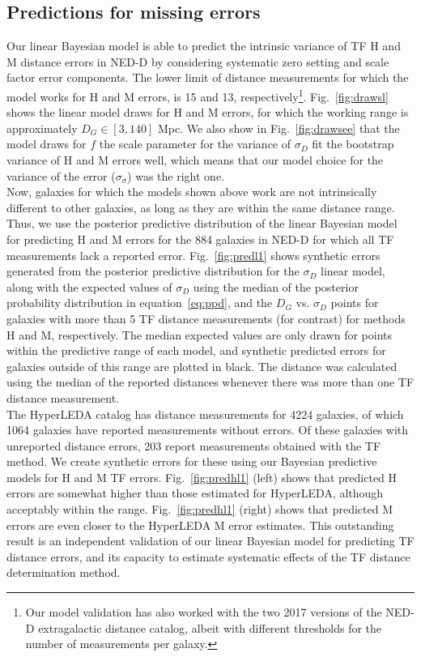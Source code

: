 \documentclass[a4paper,fleqn,usenatbib]{mnras}
\begin{document}
\subsection{Predictions for missing errors}
\label{sec:pred} 
Our linear Bayesian model is able to predict the intrinsic variance of TF H and M distance errors in NED-D by considering systematic zero setting and scale factor error components. The lower limit of distance measurements for which the model works for H and M errors, is 15 and 13, respectively\footnote{Our model validation has also worked with the two 2017 versions of the NED-D extragalactic distance catalog, albeit with different thresholds for the number of measurements per galaxy.}. Fig.~\ref{fig:drawsl} shows the linear model draws for H and M errors, for which the working range is approximately $D_G\in[3,140]$ Mpc. We also show in Fig.~\ref{fig:drawsee} that the model draws for $f$ the scale parameter for the variance of $\sigma_D$ fit the bootstrap variance of H and M errors well, which means that our model choice for the variance of the error ($\sigma_\sigma$) was the right one. \\

Now, galaxies for which the models shown above work are not intrinsically different to other galaxies, as long as they are within the same distance range. Thus, we use the posterior predictive distribution of the linear Bayesian model for predicting H and M errors for the 884 galaxies in NED-D for which all TF measurements lack a reported error. Fig.~\ref{fig:predl1} shows synthetic errors generated from the posterior predictive distribution for the $\sigma_D$ linear model, along with the expected values of $\sigma_D$ using the median of the posterior probability distribution in equation~\ref{eq:ppd}, and the $D_G$ vs. $\sigma_D$ points for galaxies with more than 5 TF distance measurements (for contrast) for methods H and M, respectively. The median expected values are only drawn for points within the predictive range of each model, and synthetic predicted errors for galaxies outside of this range are plotted in black. The distance was calculated using the median of the reported distances whenever there was more than one TF distance measurement.\\

The HyperLEDA catalog has distance measurements for 4224 galaxies, of which 1064 galaxies have reported measurements without errors. Of these galaxies with unreported distance errors, 203 report measurements obtained with the TF method. We create synthetic errors for these using our Bayesian predictive models for H and M TF errors. Fig.~\ref{fig:predhl1} (left) shows that predicted H errors are somewhat higher than those estimated for HyperLEDA, although acceptably within the range. Fig.~\ref{fig:predhl1} (right) shows that predicted M errors are even closer to the HyperLEDA M error estimates. This outstanding result is an independent validation of our linear Bayesian model for predicting TF distance errors, and its capacity to estimate systematic effects of the TF distance determination method.\\
\end{document}

